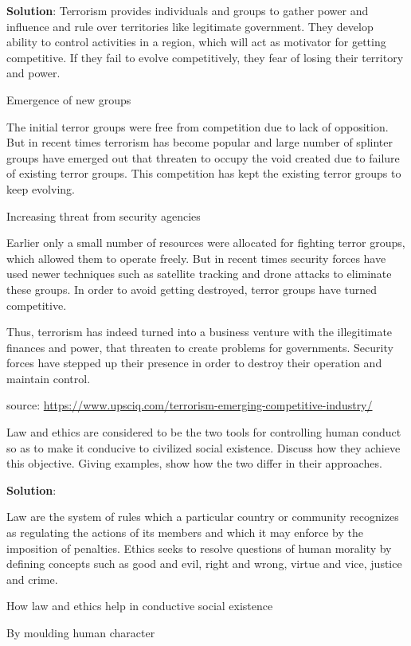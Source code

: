 \documentclass[
  openany]{book}
\newcommand{\question}{\item}
\newenvironment{solution}{ {\bfseries Solution}:}{}
\begin{document}
\begin{questions}
\begin{solution}
Terrorism provides individuals and groups to gather power and influence and rule over territories like legitimate government. They develop ability to control activities in a region, which will act as motivator for getting competitive. If they fail to evolve competitively, they fear of losing their territory and power.

Emergence of new groups

The initial terror groups were free from competition due to lack of opposition. But in recent times terrorism has become popular and large number of splinter groups have emerged out that threaten to occupy the void created due to failure of existing terror groups. This competition has kept the existing terror groups to keep evolving.

Increasing threat from security agencies

Earlier only a small number of resources were allocated for fighting terror groups, which allowed them to operate freely. But in recent times security forces have used newer techniques such as satellite tracking and drone attacks to eliminate these groups. In order to avoid getting destroyed, terror groups have turned competitive.

Thus, terrorism has indeed turned into a business venture with the illegitimate finances and power, that threaten to create problems for governments. Security forces have stepped up their presence in order to destroy their operation and maintain control.

source: \url{https://www.upsciq.com/terrorism-emerging-competitive-industry/}
\end{solution}

\question Law and ethics are considered to be the two tools for controlling human conduct so as to make it conducive to civilized social existence. Discuss how they achieve this objective. Giving examples, show how the two differ in their approaches.

\begin{solution}

Law are the system of rules which a particular country or community recognizes as regulating the actions of its members and which it may enforce by the imposition of penalties.
Ethics seeks to resolve questions of human morality by defining concepts such as good and evil, right and wrong, virtue and vice, justice and crime.

How law and ethics help in conductive social existence

By moulding human character


\end{solution}
\end{questions}
\end{document}
